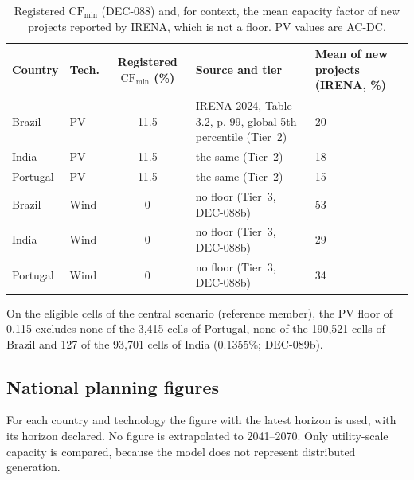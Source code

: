 \begin{table}[ht]
\centering
\caption{Registered $\mathrm{CF}_{\min}$ (DEC-088) and, for context, the mean capacity factor of new projects reported by IRENA, which is not a floor. PV values are AC-DC.}
\label{tab:g4-cf}
\small
\begin{tabular}{llcp{4.6cm}p{3.0cm}}
\toprule
Country & Tech. & Registered $\mathrm{CF}_{\min}$ (\%) & Source and tier & Mean of new projects (IRENA, \%) \\
\midrule
Brazil   & PV   & 11.5 & IRENA 2024, Table 3.2, p. 99, global 5th percentile (Tier~2) & 20 \\
India    & PV   & 11.5 & the same (Tier~2) & 18 \\
Portugal & PV   & 11.5 & the same (Tier~2) & 15 \\
Brazil   & Wind & 0    & no floor (Tier~3, DEC-088b) & 53 \\
India    & Wind & 0    & no floor (Tier~3, DEC-088b) & 29 \\
Portugal & Wind & 0    & no floor (Tier~3, DEC-088b) & 34 \\
\bottomrule
\end{tabular}
\end{table}

On the eligible cells of the central scenario (reference member), the PV floor of 0.115 excludes none of the 3,415 cells of Portugal, none of the 190,521 cells of Brazil and 127 of the 93,701 cells of India (0.1355\%; DEC-089b).

\subsection{National planning figures}
\label{sec:g4-targets}
For each country and technology the figure with the latest horizon is used, with its horizon declared. No figure is extrapolated to 2041--2070. Only utility-scale capacity is compared, because the model does not represent distributed generation.

